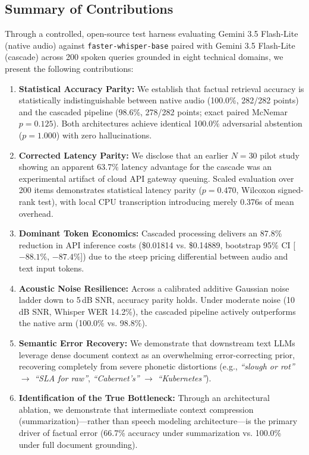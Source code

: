 \documentclass[10pt,a4paper,twocolumn]{article}
\begin{document}
\subsection{Summary of Contributions}
Through a controlled, open-source test harness evaluating Gemini 3.5 Flash-Lite (native audio) against \texttt{faster-whisper-base} paired with Gemini 3.5 Flash-Lite (cascade) across 200 spoken queries grounded in eight technical domains, we present the following contributions:
\begin{enumerate}
    \item \textbf{Statistical Accuracy Parity:} We establish that factual retrieval accuracy is statistically indistinguishable between native audio (100.0\%, 282/282 points) and the cascaded pipeline (98.6\%, 278/282 points; exact paired McNemar $p = 0.125$). Both architectures achieve identical 100.0\% adversarial abstention ($p = 1.000$) with zero hallucinations.
    \item \textbf{Corrected Latency Parity:} We disclose that an earlier $N=30$ pilot study showing an apparent 63.7\% latency advantage for the cascade was an experimental artifact of cloud API gateway queuing. Scaled evaluation over 200 items demonstrates statistical latency parity ($p = 0.470$, Wilcoxon signed-rank test), with local CPU transcription introducing merely 0.376s of mean overhead.
    \item \textbf{Dominant Token Economics:} Cascaded processing delivers an 87.8\% reduction in API inference costs (\$0.01814 vs. \$0.14889, bootstrap 95\% CI [$-88.1\%$, $-87.4\%$]) due to the steep pricing differential between audio and text input tokens.
    \item \textbf{Acoustic Noise Resilience:} Across a calibrated additive Gaussian noise ladder down to 5\,dB SNR, accuracy parity holds. Under moderate noise (10\,dB SNR, Whisper WER 14.2\%), the cascaded pipeline actively outperforms the native arm (100.0\% vs. 98.8\%).
    \item \textbf{Semantic Error Recovery:} We demonstrate that downstream text LLMs leverage dense document context as an overwhelming error-correcting prior, recovering completely from severe phonetic distortions (e.g., \textit{``slough or rot''} $\to$ \textit{``SLA for raw''}, \textit{``Cabernet's''} $\to$ \textit{``Kubernetes''}).
    \item \textbf{Identification of the True Bottleneck:} Through an architectural ablation, we demonstrate that intermediate context compression (summarization)—rather than speech modeling architecture—is the primary driver of factual error (66.7\% accuracy under summarization vs. 100.0\% under full document grounding).
\end{enumerate}
\end{document}
